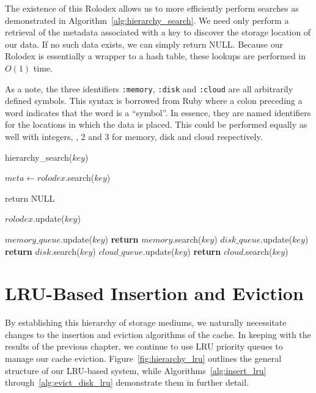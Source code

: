 The existence of this Rolodex allows us to more efficiently perform searches as
demonstrated in Algorithm~\ref{alg:hierarchy_search}. We need only perform a
retrieval of the metadata associated with a key to discover the storage
location of our data. If no such data exists, we can simply return NULL\@.
Because our Rolodex is essentially a wrapper to a hash table, these lookups are
performed in $O(1)$ time.

As a note, the three identifiers {\tt :memory}, {\tt :disk} and {\tt :cloud}
are all arbitrarily defined symbols. This syntax is borrowed from Ruby where a
colon preceding a word indicates that the word is a ``symbol''. In essence,
they are named identifiers for the locations in which the data is placed. This
could be performed equally as well with integers, , 2 and 3 for memory,
disk and cloud respectively.

\begin{algorithm}[htp]
\small
\caption{\label{alg:hierarchy_search}hierarchy\_search($key$)}
\begin{algorithmic}[1]
\STATE $meta \leftarrow rolodex$.search($key$)

  \STATE return NULL
\ENDIF

\STATE $rolodex$.update($key$)

	\STATE $memory\_queue$.update($key$)
	\STATE \textbf{return} $memory$.search($key$)
	\STATE $disk\_queue$.update($key$)
	\STATE \textbf{return} $disk$.search($key$)
	\STATE $cloud\_queue$.update($key$)
	\STATE \textbf{return} $cloud$.search($key$)
\ENDIF
\end{algorithmic}
\end{algorithm}


\section{LRU-Based Insertion and Eviction} %
\label{sec:storage_insertion_eviction}
By establishing this hierarchy of storage mediums, we naturally necessitate
changes to the insertion and eviction algorithms of the cache. In keeping with
the results of the previous chapter, we continue to use LRU priority queues to
manage our cache eviction. Figure~\ref{fig:hierarchy_lru} outlines the general
structure of our LRU-based system, while Algorithms~\ref{alg:insert_lru}
through~\ref{alg:evict_disk_lru} demonstrate them in further detail.

